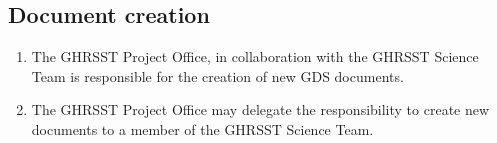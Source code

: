 \subsection{Document creation}
\begin{enumerate}[noitemsep]
    \item The GHRSST Project Office, in collaboration with the GHRSST Science Team is responsible for the creation of new GDS documents.
    \item The GHRSST Project Office may delegate the responsibility to create new documents to a member of the GHRSST Science Team.
\end{enumerate}